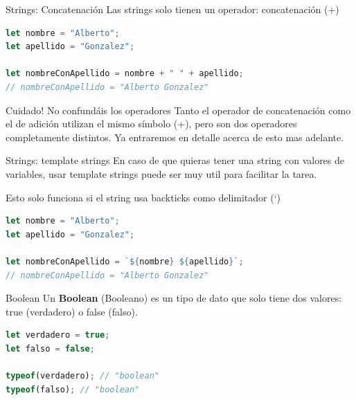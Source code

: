 \documentclass{beamer}
\begin{document}
\begin{frame}[fragile]{Strings: Concatenación}
Las strings solo tienen un operador: concatenación (+)
\begin{lstlisting}[language=JavaScript]
let nombre = "Alberto";
let apellido = "Gonzalez";

let nombreConApellido = nombre + " " + apellido;
// nombreConApellido = "Alberto Gonzalez"
\end{lstlisting}
\begin{block}{Cuidado! No confundáis los operadores}
Tanto el operador de concatenación como el de adición utilizan el mismo símbolo (+), pero son dos operadores completamente distintos. Ya entraremos en detalle acerca de esto mas adelante.
\end{block}
\end{frame}

\begin{frame}[fragile]{Strings: template strings}
En caso de que quieras tener una string con valores de variables, usar template strings puede ser muy util para facilitar la tarea.

Esto solo funciona si el string usa backticks como delimitador (`)\bigskip

\begin{lstlisting}[language=JavaScript]
let nombre = "Alberto";
let apellido = "Gonzalez";

let nombreConApellido = `${nombre} ${apellido}`;
// nombreConApellido = "Alberto Gonzalez"
\end{lstlisting}
\end{frame}

\begin{frame}[fragile]{Boolean}
Un \textbf{Boolean} (Booleano) es un tipo de dato que solo tiene dos valores: true (verdadero) o false (falso).

\begin{lstlisting}[language=JavaScript]
let verdadero = true;
let falso = false;

typeof(verdadero); // "boolean"
typeof(falso); // "boolean"

\end{lstlisting}
\end{frame}
\end{document}

